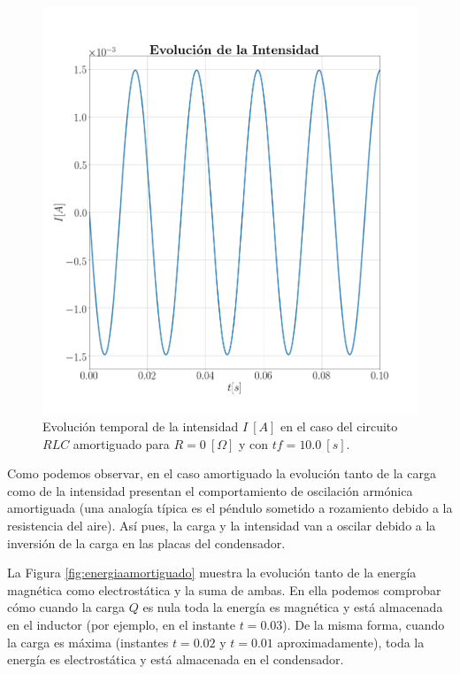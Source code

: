 \documentclass[journal]{IEEEtran}
\begin{document}
\begin{figure}[!htb]
    \centering
    \includegraphics[width=\linewidth,trim={40 70 70 70},clip]{intensidadamortiguado.png}
    \caption{Evolución temporal de la intensidad $I~[A]$ en el caso del circuito $RLC$ amortiguado para $R=0~[\Omega]$ y con $tf=10.0~[s]$.}
    \label{fig:intensidadamortiguado}
\end{figure}

\newpage

Como podemos observar, en el caso amortiguado la evolución tanto de la carga como de la intensidad presentan el comportamiento de oscilación armónica amortiguada (una analogía típica es el péndulo sometido a rozamiento debido a la resistencia del aire). Así pues, la carga y la intensidad van a oscilar debido a la inversión de la carga en las placas del condensador.

La Figura \ref{fig:energiaamortiguado} muestra la evolución tanto de la energía magnética como electrostática y la suma de ambas. En ella podemos comprobar cómo cuando la carga $Q$ es nula toda la energía es magnética y está almacenada en el inductor (por ejemplo, en el instante $t=0.03$). De la misma forma, cuando la carga es máxima (instantes $t=0.02$ y $t=0.01$ aproximadamente), toda la energía es electrostática y está almacenada en el condensador.
\end{document}
